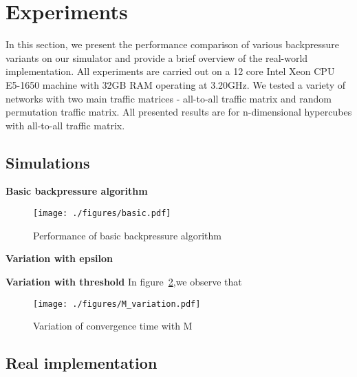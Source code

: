 \label{experiments}
\section{Experiments}

In this section, we present the performance comparison of various backpressure variants on our simulator and provide a brief overview of the real-world implementation. All experiments are carried out on a 12 core Intel Xeon CPU E5-1650 machine with 32GB RAM operating at 3.20GHz. We tested a variety of networks with two main traffic matrices - all-to-all traffic matrix and random permutation traffic matrix. All presented results are for n-dimensional hypercubes with all-to-all traffic matrix.

\subsection{Simulations}

\textbf{Basic backpressure algorithm}
\begin{figure}
\texttt{[image: ./figures/basic.pdf]}
\caption{\small Performance of basic backpressure algorithm}
\label{fig:M_1}
\end{figure}

\textbf{Variation with epsilon}

\textbf{Variation with threshold}
In figure~\ref{fig:M_1},we observe that 
\begin{figure}
\texttt{[image: ./figures/M\_variation.pdf]}
\caption{\small Variation of convergence time with M}
\label{fig:M_1}
\end{figure}


\subsection{Real implementation}

